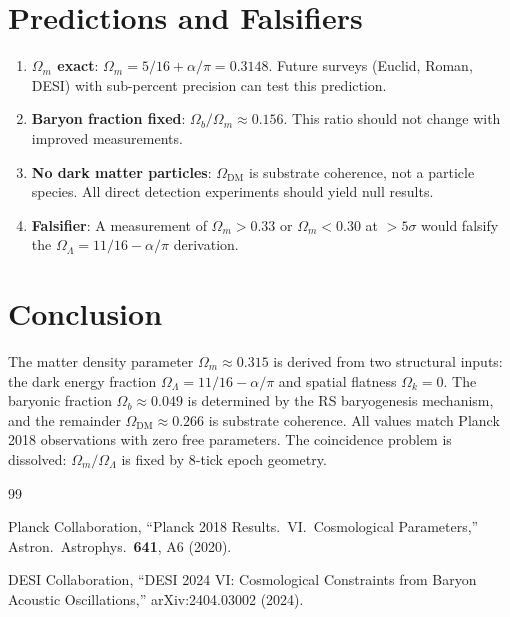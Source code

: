 \documentclass[12pt,a4paper]{article}
\theoremstyle{definition}
\theoremstyle{remark}
\begin{document}
\section{Predictions and Falsifiers}
\label{sec:predictions}

\begin{enumerate}
  \item \textbf{$\Omega_m$ exact}: $\Omega_m = 5/16 + \alpha/\pi
  = 0.3148$.  Future surveys (Euclid, Roman, DESI) with
  sub-percent precision can test this prediction.

  \item \textbf{Baryon fraction fixed}:
  $\Omega_b/\Omega_m \approx 0.156$.  This ratio should not change
  with improved measurements.

  \item \textbf{No dark matter particles}: $\Omega_{\mathrm{DM}}$
  is substrate coherence, not a particle species.  All direct
  detection experiments should yield null results.

  \item \textbf{Falsifier}: A measurement of
  $\Omega_m > 0.33$ or $\Omega_m < 0.30$ at $>5\sigma$ would
  falsify the $\Omega_\Lambda = 11/16 - \alpha/\pi$ derivation.
\end{enumerate}

\section{Conclusion}
\label{sec:conclusion}

The matter density parameter $\Omega_m \approx 0.315$ is derived
from two structural inputs: the dark energy fraction
$\Omega_\Lambda = 11/16 - \alpha/\pi$ and spatial flatness
$\Omega_k = 0$.  The baryonic fraction $\Omega_b \approx 0.049$
is determined by the RS baryogenesis mechanism, and the remainder
$\Omega_{\mathrm{DM}} \approx 0.266$ is substrate coherence.  All
values match Planck 2018 observations with zero free parameters.
The coincidence problem is dissolved: $\Omega_m/\Omega_\Lambda$ is
fixed by 8-tick epoch geometry.

\begin{thebibliography}{99}

Planck Collaboration, ``Planck 2018 Results.\ VI.\ Cosmological
Parameters,'' Astron.\ Astrophys.\ \textbf{641}, A6 (2020).

DESI Collaboration, ``DESI 2024 VI: Cosmological Constraints from
Baryon Acoustic Oscillations,'' arXiv:2404.03002 (2024).

\end{thebibliography}
\end{document}
